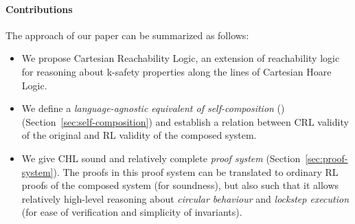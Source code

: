 \paragraph{Contributions} The approach of our paper can be summarized as follows:
\begin{itemize}
\item We propose Cartesian Reachability Logic, an extension of reachability
  logic for reasoning about k-safety properties along the lines of Cartesian
  Hoare Logic.
\item We define a \emph{language-agnostic equivalent of self-composition}
  (\cite{BartheDR11}) (Section~\ref{sec:self-composition}) and establish a relation between CRL validity of the
  original and RL validity of the composed system.
\item We give CHL sound and relatively complete \emph{proof system}
  (Section~\ref{sec:proof-system}). The proofs in this proof system can be
  translated to ordinary RL proofs of the composed system (for soundness), but
  also such that it allows relatively high-level reasoning about
  \emph{circular behaviour} and \emph{lockstep execution} (for ease of
  verification and simplicity of invariants).
\end{itemize}



